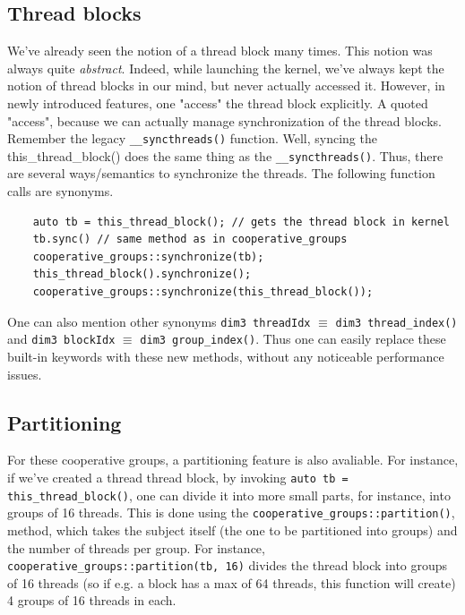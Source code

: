 \documentclass[12pt]{article}
\begin{document}
\subsection*{Thread blocks}
We've already seen the notion of a thread block many times. This notion was always quite \textit{abstract}. Indeed, while launching the kernel, we've 
always kept the notion of thread blocks in our mind, but never actually accessed it. However, in newly introduced features, one "access" the 
thread block explicitly. A quoted "access", because we can actually manage synchronization of the thread blocks. Remember the legacy \verb|__syncthreads()| function. 
Well, syncing the this\_thread\_block() does the same thing as the \verb|__syncthreads()|. Thus, there are several ways/semantics to synchronize the threads. 
The following function calls are synonyms.


\begin{listing}
\begin{verbatim}
    auto tb = this_thread_block(); // gets the thread block in kernel
    tb.sync() // same method as in cooperative_groups
    cooperative_groups::synchronize(tb);
    this_thread_block().synchronize();
    cooperative_groups::synchronize(this_thread_block());
\end{verbatim}
\end{listing}

One can also mention other synonyms \verb|dim3 threadIdx| $\equiv$ \verb|dim3 thread_index()| and \verb|dim3 blockIdx| $\equiv$ \verb|dim3 group_index()|. Thus one can easily replace 
these built-in keywords with these new methods, without any noticeable performance issues.

\subsection*{Partitioning}
For these cooperative groups, a partitioning feature is also avaliable. For instance, if 
we've created a thread thread block, by invoking \verb|auto tb = this_thread_block()|,
one can divide it into more small parts, for instance, into groups of 16 threads. 
This is done using the \verb|cooperative_groups::partition()|, method, which takes the 
subject itself (the one to be partitioned into groups) and the number of threads per group.
For instance, \verb|cooperative_groups::partition(tb, 16)| divides the thread block into 
groups of 16 threads (so if e.g. a block has a max of 64 threads, this function will create)
4 groups of 16 threads in each. 
\end{document}
